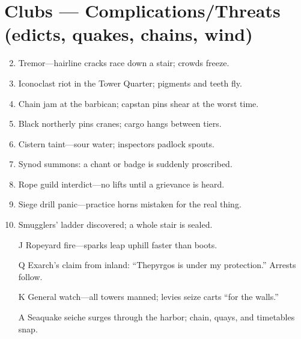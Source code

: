 \section*{Clubs --- Complications/Threats (edicts, quakes, chains, wind)}
\begin{enumerate}
\setcounter{enumi}{1}
\item Tremor---hairline cracks race down a stair; crowds freeze.
\item Iconoclast riot in the Tower Quarter; pigments and teeth fly.
\item Chain jam at the barbican; capstan pins shear at the worst time.
\item Black northerly pins cranes; cargo hangs between tiers.
\item Cistern taint---sour water; inspectors padlock spouts.
\item Synod summons: a chant or badge is suddenly proscribed.
\item Rope guild interdict---no lifts until a grievance is heard.
\item Siege drill panic---practice horns mistaken for the real thing.
\item Smugglers' ladder discovered; a whole stair is sealed.
\item[J] Ropeyard fire---sparks leap uphill faster than boots.
\item[Q] Exarch's claim from inland: ``Thepyrgos is under my protection.'' Arrests follow.
\item[K] General watch---all towers manned; levies seize carts ``for the walls.''
\item[A] Seaquake seiche surges through the harbor; chain, quays, and timetables snap.
\end{enumerate}

